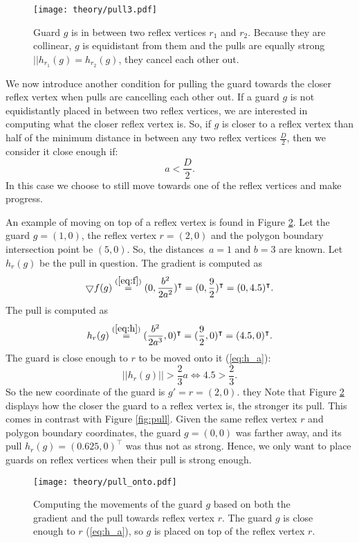 \begin{figure}[h!]
    \centering
    \texttt{[image: theory/pull3.pdf]}
    \caption{Guard $g$ is in between two reflex vertices $r_1$ and $r_2$. Because they are collinear, $g$ is equidistant from them and the pulls are equally strong $||h_{r_1}(g) = h_{r_2}(g)$, they cancel each other out.}
    \label{fig:pull_cancel}
\end{figure}

We  now introduce another condition for pulling the guard towards the closer reflex vertex when pulls are cancelling each other out. If a guard $g$ is not equidistantly placed in between two reflex vertices, we are interested in computing what the closer reflex vertex is. So, if $g$ is closer to a reflex vertex than half of the minimum distance in between any two reflex vertices $\frac D 2$, then we consider it close enough if: $$a < \frac D 2.$$
In this case we  choose to still move towards one of the reflex vertices and make progress.

An example of moving on top of a reflex vertex is found in Figure \ref{fig:pull_onto}. Let the guard $g = (1, 0)$, the reflex vertex $r = (2, 0)$ and the polygon boundary intersection point be $(5, 0)$. So, the distances~$a = 1$ and $b = 3$ are known. Let $h_r(g)$ be the pull in question. The gradient is computed as
$$\bigtriangledown f(g) \overset{(\ref{eq:f})}{=} (0, \frac{b^2}{2a^2})^\intercal = (0, \frac{9}{2})^\intercal = (0, 4.5)^\intercal.$$
The pull is computed as 
$$h_r(g) \overset{(\ref{eq:h})}{=} (\frac{b^2}{2a^3}, 0)^\intercal = (\frac{9}{2}, 0)^\intercal = (4.5, 0)^\intercal.$$
The guard is close enough to $r$ to be moved onto it (\ref{eq:h_a}):
$$||h_r(g)|| > \frac 2 3 a \iff 4.5 > \frac 2 3.$$
So the new coordinate of the guard is $g' = r = (2, 0)$.
they
Note that Figure \ref{fig:pull_onto} displays how the closer the guard to a reflex vertex is, the stronger its pull. This comes in contrast with Figure \ref{fig:pull}. Given the same reflex vertex $r$ and polygon boundary coordinates, the guard $g = (0, 0)$ was farther away, and its pull $h_r(g) = (0.625, 0)^\intercal$ was thus not as strong. Hence, we only want to place guards on reflex vertices when their pull is strong enough.

\begin{figure}
    \centering
    \texttt{[image: theory/pull\_onto.pdf]}
    \caption{Computing the movements of the guard $g$ based on both the gradient and the pull towards reflex vertex $r$. The guard $g$ is close enough to $r$ (\ref{eq:h_a}), so $g$ is placed on top of the reflex vertex $r$.}
    \label{fig:pull_onto}
\end{figure}


